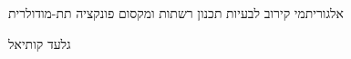 \begin{hebrew}

\begin{center}
{\Huge
אלגוריתמי קירוב לבעיות תכנון רשתות ומקסום פונקציה תת-מודולרית
}


{\huge
גלעד קותיאל
}
\end{center}
\end{hebrew}
